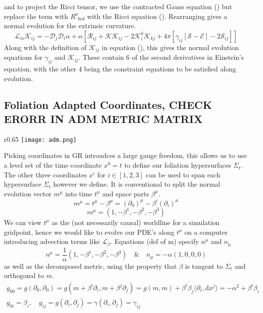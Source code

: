 \documentclass[11pt, oneside]{report}  %
\newcommand{\D}{\mathcal{D}}
\newcommand{\E}{\mathcal{E}}
\renewcommand{\S}{\mathcal{S}}
\newcommand{\K}{\mathcal{K}}
\renewcommand{\L}{\mathcal{L}}
\newcommand{\R}{\mathcal{R}}
\newcommand{\dd}{\mathrm{d}}
\numberwithin{equation}{section}
\begin{document}
and to project the Ricci tensor, we use the contracted Gauss equation () but replace the term with $R^a_{\,\,\,bcd}$ with the Ricci equation (). Rearranging gives a normal evolution for the extrinsic curvature.
\begin{equation} \L_m \K_{ij} = -\D_j\D_i \alpha + \alpha \left[ \R_{ij} + \K\K_{ij} - 2\K^k_i\K_{kj} + 4\pi \left[ \gamma_{ij}\left[ \S-\E\right]-2\S_{ij}\right]\right]\end{equation}
Along with the definition of $\K_{ij}$ in equation (), this gives the normal evolution equations for $\gamma_{ij}$ and $\K_{ij}$. These contain 6 of the second derivatives in Einstein's equation, with the other 4 being the constraint equations to be satisfied along evolution.

\subsection{Foliation Adapted Coordinates, CHECK ERORR IN ADM METRIC MATRIX}
\begin{wrapfigure}{r}{0.65\textwidth}
    \texttt{[image: adm.png]}
\end{wrapfigure}
Picking coordinates in GR introudces a large gauge freedom, this allows us to use a level set of the time coordinate $x^0=t$ to define our foliation hypersurfaces $\Sigma_t$. The other three coordinates $x^i$ for $i\in[1,2,3]$ can be used to span each hypersurface $\Sigma_t$ however we define. It is conventional to split the normal evolution vector $m^\mu$ into time $t^\mu$ and space parts $\beta^\mu$.
\begin{equation} m^\mu = t^\mu - \beta^\mu  = (\partial_0)^\mu - \beta^i (\partial_i)^\mu \end{equation}
\begin{equation} m^\mu = \left( 1,-\beta^1,-\beta^2,-\beta^3\right) \end{equation}
We can view $t^\mu$ as the (not necessarily causal) worldline for a simulation gridpoint, hence we would like to evolve our PDE's along $t^\mu$ on a computer introducing advection terms like $\L_\beta$. Equations (def of m) specify $n^\mu$ and $n_\mu$
\begin{equation} n^\mu =  \frac{1}{\alpha}\left( 1,-\beta^1,-\beta^2,-\beta^3\right)\quad \& \quad n_\mu = -\alpha\left( 1,0,0,0\right)\end{equation}
as well as the decomposed metric, using the property that $\beta$ is tangent to $\Sigma_t$ and orthogonal to $m$.
\begin{gather} g_{00} = g(\partial_0,\partial_0) = g(m + \beta^i \partial_i,m + \beta^j\partial_j) = g(m,m) + \beta^i \beta_j \langle \partial_i,\dd x^j \rangle = -\alpha^2 + \beta^i \beta_i \nonumber\\
 g_{0i} = \beta_i,\quad
 g_{ij} = g(\partial_i,\partial_j) = \gamma(\partial_i,\partial_j) = \gamma_{ij}\nonumber\end{gather}
\end{document}
